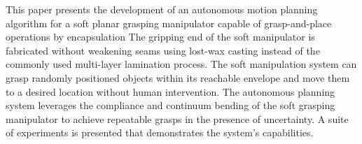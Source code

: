 This paper presents the development of an autonomous motion planning algorithm for a soft planar grasping manipulator capable of grasp-and-place operations by encapsulation
The gripping end of the soft manipulator is fabricated without weakening seams using lost-wax casting instead of the commonly used multi-layer lamination process.
The soft manipulation system can grasp randomly positioned objects within its reachable envelope and move them to a desired location without human intervention.
The autonomous planning system leverages the compliance and continuum bending of the soft grasping manipulator to achieve repeatable grasps in the presence of uncertainty.
A suite of experiments is presented that demonstrates the system's capabilities.